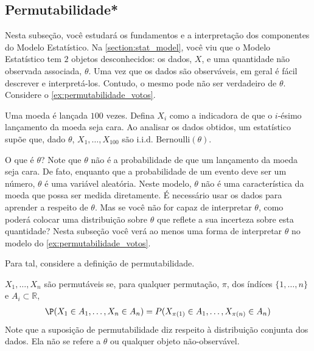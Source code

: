 \subsection{Permutabilidade*}

Nesta subseção, você estudará os fundamentos e
a interpretação dos componentes do Modelo Estatístico.
Na \cref{section:stat_model}, você viu que
o Modelo Estatístico tem $2$ objetos desconhecidos:
os dados, $X$, e uma
quantidade não observada associada, $\theta$.
Uma vez que os dados são observáveis,
em geral é fácil descrever e interpretá-los.
Contudo, o mesmo pode não ser verdadeiro de $\theta$.
Considere o \cref{ex:permutabilidade_votos}.

\begin{example}
 \label{ex:permutabilidade_votos}
 Uma moeda é lançada $100$ vezes.
 Defina $X_{i}$ como a indicadora de que
 o $i$-ésimo lançamento da moeda seja cara.
 Ao analisar os dados obtidos, 
 um estatístico supõe que, dado $\theta$,
 $X_{1},\ldots,X_{100}$ são i.i.d. 
 $\text{Bernoulli}(\theta)$.
\end{example}

O que é $\theta$? 
Note que $\theta$ não é a probabilidade de que 
um lançamento da moeda seja cara.
De fato, enquanto que a probabilidade de um 
evento deve ser um número,
$\theta$ é uma variável aleatória.
Neste modelo, $\theta$ não é uma 
característica da moeda que
possa ser medida diretamente.
É necessário usar os dados para 
aprender a respeito de $\theta$.
Mas se você não for capaz de interpretar $\theta$,
como poderá colocar uma distribuição sobre $\theta$ que
reflete a sua incerteza sobre esta quantidade?
Nesta subseção você verá ao menos uma forma de
interpretar $\theta$ no modelo do
\cref{ex:permutabilidade_votos}.

Para tal, considere a definição de permutabilidade.

\begin{definition}
 $X_{1},\ldots,X_{n}$ são permutáveis se,
 para qualquer permutação, $\pi$, dos índíces 
 $\{1,\ldots,n\}$ e $A_{i} \subset \mathbb{R}$,
 \begin{align*}
  \P(X_{1} \in A_{1},\ldots,X_{n} \in A_{n})
  = P(X_{\pi(1)} \in A_{1},\ldots,X_{\pi(n)} \in A_{n})
 \end{align*}
 Note que a suposição de permutabilidade diz respeito à
 distribuição conjunta dos dados.
 Ela não se refere a $\theta$ ou 
 qualquer objeto não-observável.
\end{definition}

